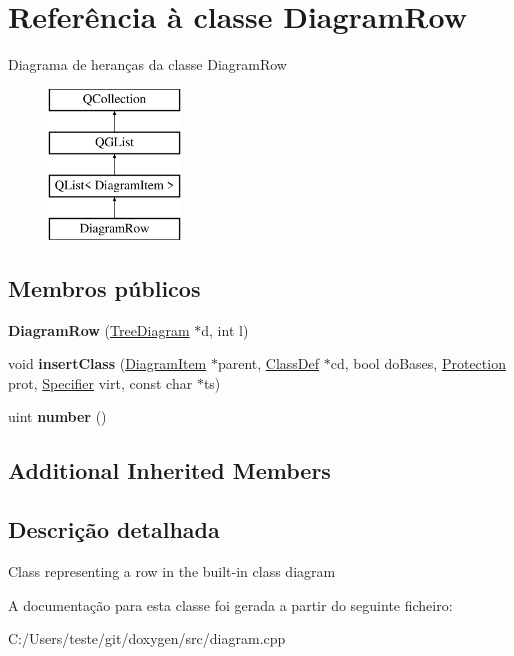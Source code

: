 \hypertarget{class_diagram_row}{\section{Referência à classe Diagram\-Row}
\label{class_diagram_row}
}
Diagrama de heranças da classe Diagram\-Row\begin{figure}[H]
\begin{center}
\leavevmode
\includegraphics[height=4.000000cm]{class_diagram_row}
\end{center}
\end{figure}
\subsection*{Membros públicos}
\begin{DoxyCompactItemize}
\item 
\hypertarget{class_diagram_row_a9c9d4a9355b0bc88cbb3b92abca772a2}{{\bfseries Diagram\-Row} (\hyperlink{class_tree_diagram}{Tree\-Diagram} $\ast$d, int l)}\label{class_diagram_row_a9c9d4a9355b0bc88cbb3b92abca772a2}

\item 
\hypertarget{class_diagram_row_ac4a32db83188ff1e4e7cef315b3bd4f7}{void {\bfseries insert\-Class} (\hyperlink{class_diagram_item}{Diagram\-Item} $\ast$parent, \hyperlink{class_class_def}{Class\-Def} $\ast$cd, bool do\-Bases, \hyperlink{types_8h_a90e352184df58cd09455fe9996cd4ded}{Protection} prot, \hyperlink{types_8h_ab16236bdd10ddf4d73a9847350f0017e}{Specifier} virt, const char $\ast$ts)}\label{class_diagram_row_ac4a32db83188ff1e4e7cef315b3bd4f7}

\item 
\hypertarget{class_diagram_row_afec7ebf45f016b1be11f3ac8e60745e4}{uint {\bfseries number} ()}\label{class_diagram_row_afec7ebf45f016b1be11f3ac8e60745e4}

\end{DoxyCompactItemize}
\subsection*{Additional Inherited Members}


\subsection{Descrição detalhada}
Class representing a row in the built-\/in class diagram 

A documentação para esta classe foi gerada a partir do seguinte ficheiro\-:\begin{DoxyCompactItemize}
\item 
C\-:/\-Users/teste/git/doxygen/src/diagram.\-cpp\end{DoxyCompactItemize}
